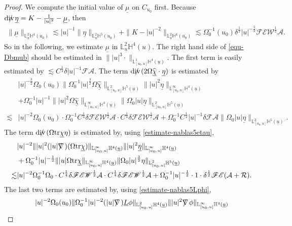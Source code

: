 \documentclass[11pt,reqno]{amsart}
\theoremstyle{definition}
\numberwithin{equation}{section}
\newcommand{\tr}{\mathrm{tr}}
\renewcommand{\L}{\mathbb{L}}
\renewcommand{\H}{\mathbb{H}}
\def\chib{\underline{\chi}}
\def\chibh{\widehat{\underline{\chi}}}
\def\etab{\underline{\eta}}
\def\Lb{\underline{L}}
\def\mub{\underline{\mu}}
\def\tr{\mathrm{tr}}
\def\ub{\underline{u}}
\def\nablas{\mbox{$\nabla \mkern -13mu /$ }}
\def\divs{\mbox{$\mathrm{div} \mkern -13mu /$ }}
\begin{document}
\begin{proof}
We compute the initial value of $\mub$ on $C_{u_0}$ first. Because $\divs\etab=K-\frac{1}{|u|^2}-\mub$, then
\begin{align}\label{estimate-mub0}
\|\mub\|_{\L^2_{\ub}\H^4(u_0)}\lesssim|u|^{-1}\|\etab\|_{\L^2_{\ub}\H^5(u_0)}+\|K-|u|^{-2}\|_{\L^2_{\ub}\H^4(u_0)}\lesssim\Omega_0^{-1}(u_0)\delta^{\frac{1}{2}}|u|^{-\frac{5}{2}}\mathscr{F}\mathscr{E}\mathscr{W}^{\frac{1}{2}}\mathcal{A}.
\end{align}
So in the following, we estimate $\mub$ in $\L^2_{\ub}\H^4(u)$. The right hand side of \eqref{equ-Dbmub} should be estimated in $\||u|^3\cdot\|_{\L^1_{[u_0,u]}\H^4(\ub)}$. The first term is easily estimated by $\lesssim C^{\frac{1}{4}}\delta|u|^{-1}\mathscr{F}\mathcal{A}$. The term $\divs(2\Omega\chibh\cdot\etab)$ is estimated by
\begin{align*}
&|u|^{-\frac{3}{2}}\Omega_0(u_0)\|\Omega_0^{-1}|u|^{\frac{3}{2}}\Omega\chibh\|_{\L^2_{[u_0,u]}\H^5(\ub)}\||u|^{2}\etab\|_{\L^\infty_{[u_0,u]}\H^4(\ub)}\\
&+\Omega_0^{-1}|u|^{-1}\||u|^{2}\Omega\chibh\|_{\L^\infty_{[u_0,u]}\H^4(\ub)}\|\Omega_0|u|\etab\|_{\L^2_{[u_0,u]}\H^5(\ub)}\\
\lesssim&|u|^{-2}\Omega_0(u_0)\cdot \Omega_0^{-1}C^{\frac{1}{4}}\delta\mathscr{F}\mathscr{E}\mathscr{W}^{\frac{1}{2}}\mathcal{A}\cdot C^{\frac{1}{4}}\delta\mathscr{F}\mathscr{E}\mathscr{W}^{\frac{1}{2}}\mathcal{A}+\Omega_0^{-1}C^{\frac{1}{4}}|u|^{-1}\delta\mathscr{F}\mathcal{A}\|\Omega_0|u|\etab\|_{\L^2_{[u_0,u]}\H^5(\ub)}.
\end{align*}
The term $\divs(\Omega\tr\chib\eta)$ is estimated by, using \eqref{estimate-nablas5etau},
\begin{align*}
&|u|^{-2}\||u|^{2}(|u|\nablas)(\Omega\tr\chib)\|_{\L^\infty_{[u_0,u]}\H^4(\ub)}\||u|^{2}\etab\|_{\L^\infty_{[u_0,u]}\H^4(\ub)}\\
&+\Omega_0^{-1}|u|^{-\frac{1}{2}}\||u|\Omega\tr\chib\|_{\L^\infty_{[u_0,u]}\H^4(\ub)}\|\Omega_0|u|^{\frac{3}{2}}\eta\|_{\L^2_{[u_0,u]}\H^5(\ub)}\\
\lesssim&|u|^{-2}\Omega^{-1}_0\Omega_0\cdot C^\frac{1}{4}\delta\mathscr{F}\mathscr{E}\mathscr{W}^{\frac{1}{2}}\mathcal{A}\cdot C^{\frac{1}{4}}\delta\mathscr{F}\mathscr{E}\mathscr{W}^{\frac{1}{2}}\mathcal{A}+\Omega_0^{-1}|u|^{-\frac{1}{2}}\cdot1\cdot \delta^\frac{1}{2}\mathscr{F}\mathscr{E}(\mathcal{A}+\mathcal{R}).
\end{align*}
The last two terms are estimated by, using \eqref{estimate-nablas5Lphi},
\begin{align*}
&|u|^{-2}\Omega_0(u_0)\|\Omega_0^{-1}|u|^{-2}(|u|\nablas)\Lb\phi\|_{\L^2_{[u_0,u]}\H^4(\ub)}\||u|^{2}\nablas\phi\|_{\L^\infty_{[u_0,u]}\H^4(\ub)}\\

\end{align*}
\end{proof}
\end{document}
